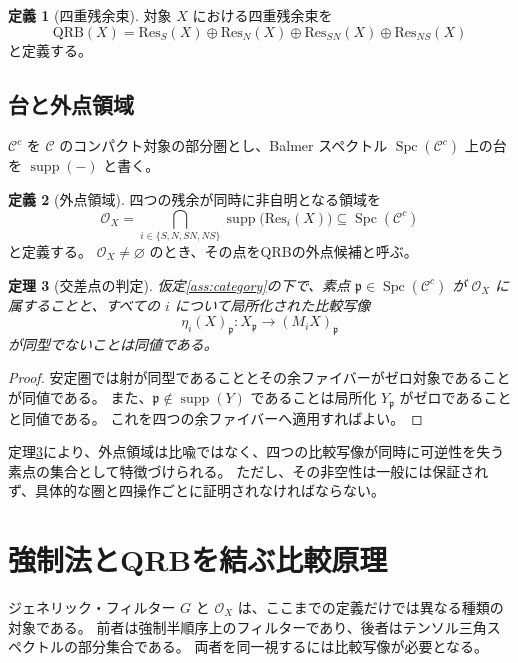 \documentclass[11pt]{ltjsarticle}
\theoremstyle{plain}
\newtheorem{theorem}{定理}[section]
\theoremstyle{definition}
\newtheorem{definition}[theorem]{定義}
\newcommand{\QRB}{\mathrm{QRB}}
\newcommand{\Res}{\mathrm{Res}}
\newcommand{\Supp}{\operatorname{supp}}
\newcommand{\Spc}{\operatorname{Spc}}
\begin{document}
\begin{definition}[四重残余束]
対象 \(X\) における四重残余束を
\[
\QRB(X)=
\Res_S(X)\oplus\Res_N(X)\oplus
\Res_{SN}(X)\oplus\Res_{NS}(X)
\]
と定義する。
\end{definition}

\subsection{台と外点領域}

\(\mathcal{C}^c\) を \(\mathcal{C}\) のコンパクト対象の部分圏とし、Balmer スペクトル
\(\Spc(\mathcal{C}^c)\) 上の台を \(\Supp(-)\) と書く\cite{balmer2005}。

\begin{definition}[外点領域]
四つの残余が同時に非自明となる領域を
\[
\mathcal{O}_X=
\bigcap_{i\in\{S,N,SN,NS\}}\Supp\bigl(\Res_i(X)\bigr)
\subseteq\Spc(\mathcal{C}^c)
\]
と定義する。
\(\mathcal{O}_X\neq\varnothing\) のとき、その点をQRBの外点候補と呼ぶ。
\end{definition}

\begin{theorem}[交差点の判定]\label{thm:intersection}
仮定\ref{ass:category}の下で、素点 \(\mathfrak{p}\in\Spc(\mathcal{C}^c)\) が \(\mathcal{O}_X\) に属することと、すべての \(i\) について局所化された比較写像
\[
\eta_i(X)_{\mathfrak p}\colon
X_{\mathfrak p}\longrightarrow(M_iX)_{\mathfrak p}
\]
が同型でないことは同値である。
\end{theorem}

\begin{proof}
安定圏では射が同型であることとその余ファイバーがゼロ対象であることが同値である。
また、\(\mathfrak p\notin\Supp(Y)\) であることは局所化 \(Y_{\mathfrak p}\) がゼロであることと同値である。
これを四つの余ファイバーへ適用すればよい。
\end{proof}

定理\ref{thm:intersection}により、外点領域は比喩ではなく、四つの比較写像が同時に可逆性を失う素点の集合として特徴づけられる。
ただし、その非空性は一般には保証されず、具体的な圏と四操作ごとに証明されなければならない。

\section{強制法とQRBを結ぶ比較原理}
\label{sec:comparison}

ジェネリック・フィルター \(G\) と \(\mathcal{O}_X\) は、ここまでの定義だけでは異なる種類の対象である。
前者は強制半順序上のフィルターであり、後者はテンソル三角スペクトルの部分集合である。
両者を同一視するには比較写像が必要となる。
\end{document}

